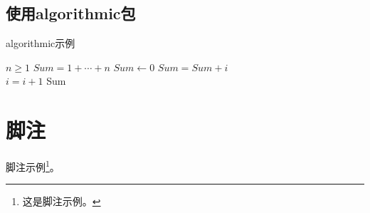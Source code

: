 \subsection{使用algorithmic包}

\begin{algorithm}[!ht]
\caption{algorithmic示例}
\begin{algorithmic}[1] %
    \REQUIRE $n \geq 1$                  %
    \ENSURE $Sum = 1 + \cdots + n$       %
    \STATE $Sum \leftarrow 0$            %
    \ELSE
            \STATE $Sum = Sum + i$\\
            \STATE $i = i + 1$
        \ENDFOR
    \ENDIF
    \RETURN Sum
\end{algorithmic}
\end{algorithm}




\section{脚注}

脚注示例\footnote{这是脚注示例。}。

